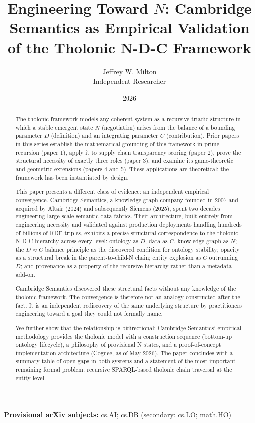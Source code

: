 \documentclass[12pt]{article}
\title{Engineering Toward $N$: Cambridge Semantics as Empirical Validation\\
{\large of the Tholonic N-D-C Framework}}
\author{Jeffrey W. Milton\\[4pt]\small Independent Researcher}
\date{2026}
\begin{document}
\maketitle

\noindent\textbf{Provisional arXiv subjects:} cs.AI; cs.DB (secondary: cs.LO; math.HO)

\begin{abstract}
The tholonic framework models any coherent system as a recursive triadic
structure in which a stable emergent state \(N\) (negotiation) arises
from the balance of a bounding parameter \(D\) (definition) and an
integrating parameter \(C\) (contribution). Prior papers in this series
establish the mathematical grounding of this framework in prime
recursion (paper 1), apply it to supply chain transparency scoring
(paper 2), prove the structural necessity of exactly three roles (paper
3), and examine its game-theoretic and geometric extensions (papers 4
and 5). These applications are theoretical: the framework has been
instantiated by design.

This paper presents a different class of evidence: an independent
empirical convergence. Cambridge Semantics, a knowledge graph company
founded in 2007 and acquired by Altair (2024) and subsequently Siemens
(2025), spent two decades engineering large-scale semantic data fabrics.
Their architecture, built entirely from engineering necessity and
validated against production deployments handling hundreds of billions
of RDF triples, exhibits a precise structural correspondence to the
tholonic N-D-C hierarchy across every level: ontology as \(D\), data as
\(C\), knowledge graph as \(N\); the \(D \approx C\) balance principle
as the discovered condition for ontology stability; opacity as a
structural break in the parent-to-child-N chain; entity explosion as
\(C\) outrunning \(D\); and provenance as a property of the recursive
hierarchy rather than a metadata add-on.

Cambridge Semantics discovered these structural facts without any
knowledge of the tholonic framework. The convergence is therefore not an
analogy constructed after the fact. It is an independent rediscovery of
the same underlying structure by practitioners engineering toward a goal
they could not formally name.

We further show that the relationship is bidirectional: Cambridge
Semantics' empirical methodology provides the tholonic model with a
construction sequence (bottom-up ontology lifecycle), a philosophy of
provisional N states, and a proof-of-concept implementation architecture
(Cognee, as of May 2026). The paper concludes with a summary table of
open gaps in both systems and a statement of the most important
remaining formal problem: recursive SPARQL-based tholonic chain
traversal at the entity level.
\end{abstract}
\end{document}

